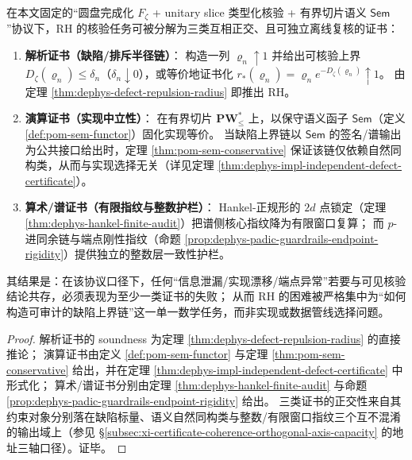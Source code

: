\begin{theorem}\label{thm:dephys-rh-certificate-audit-loop}
在本文固定的“圆盘完成化 \(F_\zeta\) + unitary slice 类型化核验 + 有界切片语义 \(\mathsf{Sem}\)”协议下，RH 的核验任务可被分解为三类互相正交、且可独立离线复核的证书：
\begin{enumerate}
  \item \textbf{解析证书（缺陷/排斥半径链）}：
  构造一列 \(\varrho_n\uparrow 1\) 并给出可核验上界 \(D_\zeta(\varrho_n)\le \delta_n\)（\(\delta_n\downarrow 0\)），或等价地证书化
  \(
  r_{\ast}(\varrho_n)=\varrho_n e^{-D_\zeta(\varrho_n)}\uparrow 1
  \)。
  由定理 \ref{thm:dephys-defect-repulsion-radius} 即推出 RH。
  \item \textbf{演算证书（实现中立性）}：
  在有界切片 \(\mathbf{PW}^{\ast}_{\le}\) 上，以保守语义函子 \(\mathsf{Sem}\)（定义 \ref{def:pom-sem-functor}）固化实现等价。
  当缺陷上界链以 \(\mathsf{Sem}\) 的签名/谱输出为公共接口给出时，定理 \ref{thm:pom-sem-conservative} 保证该链仅依赖自然同构类，从而与实现选择无关（详见定理 \ref{thm:dephys-impl-independent-defect-certificate}）。
  \item \textbf{算术/谱证书（有限指纹与整数护栏）}：
  Hankel-正规形的 \(2d\) 点锁定（定理 \ref{thm:dephys-hankel-finite-audit}）把谱侧核心指纹降为有限窗口复算；
  而 \(p\)-进同余链与端点刚性指纹（命题 \ref{prop:dephys-padic-guardrails-endpoint-rigidity}）提供独立的整数层一致性护栏。
\end{enumerate}
其结果是：在该协议口径下，任何“信息泄漏/实现漂移/端点异常”若要与可见核验结论共存，必须表现为至少一类证书的失败；
从而 RH 的困难被严格集中为“如何构造可审计的缺陷上界链”这一单一数学任务，而非实现或数据管线选择问题。
\end{theorem}

\begin{proof}
解析证书的 soundness 为定理 \ref{thm:dephys-defect-repulsion-radius} 的直接推论；
演算证书由定义 \ref{def:pom-sem-functor} 与定理 \ref{thm:pom-sem-conservative} 给出，并在定理 \ref{thm:dephys-impl-independent-defect-certificate} 中形式化；
算术/谱证书分别由定理 \ref{thm:dephys-hankel-finite-audit} 与命题 \ref{prop:dephys-padic-guardrails-endpoint-rigidity} 给出。
三类证书的正交性来自其约束对象分别落在缺陷标量、语义自然同构类与整数/有限窗口指纹三个互不混淆的输出域上（参见 \S\ref{subsec:xi-certificate-coherence-orthogonal-axis-capacity} 的地址三轴口径）。证毕。
\end{proof}

